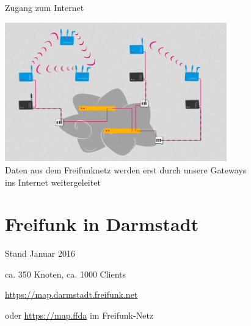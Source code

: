 \documentclass[10pt]{beamer}
\begin{document}
\begin{frame}{Zugang zum Internet}
	\begin{center}
		\includegraphics[height=6cm]{images/network_5} \\
		\vfill
		Daten aus dem Freifunknetz werden erst durch unsere Gateways\\ ins Internet weitergeleitet
	\end{center}
\end{frame}


\section{Freifunk in Darmstadt}

\begin{frame}{Stand Januar 2016}
	\begin{center}
		\vfill
		ca. 350 Knoten, ca. 1000 Clients
		\begin{center}
		\end{center}
		
		\vfill
		\url{https://map.darmstadt.freifunk.net}
		
		\tiny oder \url{https://map.ffda} im Freifunk-Netz
	\end{center}	
\end{frame}
\end{document}
